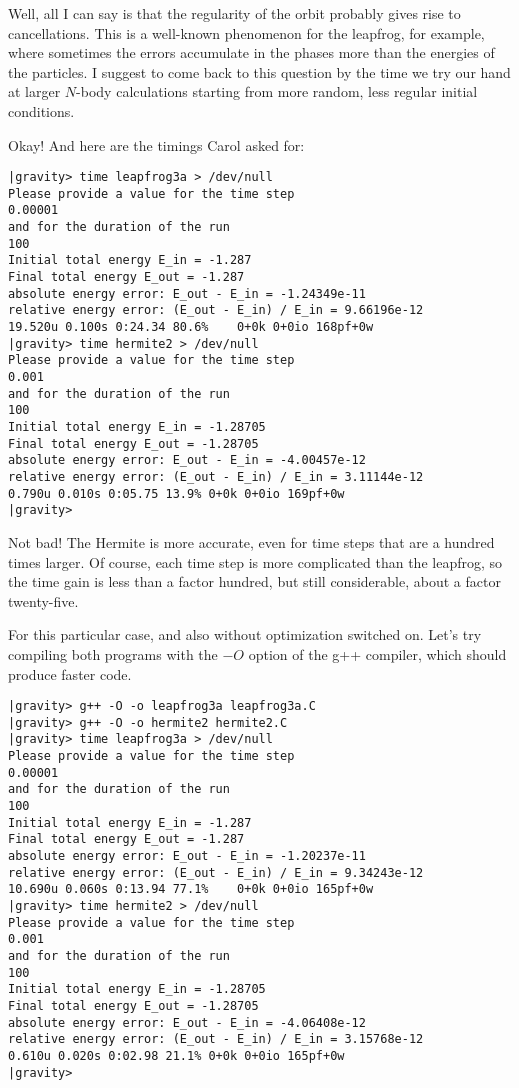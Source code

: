 \abc

\alice
Well, all I can say is that the regularity of the orbit probably gives
rise to cancellations.  This is a well-known phenomenon for the
leapfrog, for example, where sometimes the errors accumulate in the
phases more than the energies of the particles.  I suggest to come
back to this question by the time we try our hand at larger $N$-body
calculations starting from more random, less regular initial conditions.

\bob
Okay!  And here are the timings Carol asked for:

\cba

\begin{small}
\begin{verbatim}
|gravity> time leapfrog3a > /dev/null
Please provide a value for the time step
0.00001
and for the duration of the run
100
Initial total energy E_in = -1.287
Final total energy E_out = -1.287
absolute energy error: E_out - E_in = -1.24349e-11
relative energy error: (E_out - E_in) / E_in = 9.66196e-12
19.520u 0.100s 0:24.34 80.6%	0+0k 0+0io 168pf+0w
|gravity> time hermite2 > /dev/null
Please provide a value for the time step
0.001
and for the duration of the run
100
Initial total energy E_in = -1.28705
Final total energy E_out = -1.28705
absolute energy error: E_out - E_in = -4.00457e-12
relative energy error: (E_out - E_in) / E_in = 3.11144e-12
0.790u 0.010s 0:05.75 13.9%	0+0k 0+0io 169pf+0w
|gravity> 
\end{verbatim}
\end{small}

\abc

\carol
Not bad!  The Hermite is more accurate, even for time steps that are a
hundred times larger.  Of course, each time step is more complicated
than the leapfrog, so the time gain is less than a factor hundred, but
still considerable, about a factor twenty-five.

\alice
For this particular case, and also without optimization switched on.
Let's try compiling both programs with the $-O$ option of the g++
compiler, which should produce faster code.

\cba

\begin{small}
\begin{verbatim}
|gravity> g++ -O -o leapfrog3a leapfrog3a.C
|gravity> g++ -O -o hermite2 hermite2.C
|gravity> time leapfrog3a > /dev/null
Please provide a value for the time step
0.00001
and for the duration of the run
100
Initial total energy E_in = -1.287
Final total energy E_out = -1.287
absolute energy error: E_out - E_in = -1.20237e-11
relative energy error: (E_out - E_in) / E_in = 9.34243e-12
10.690u 0.060s 0:13.94 77.1%	0+0k 0+0io 165pf+0w
|gravity> time hermite2 > /dev/null
Please provide a value for the time step
0.001
and for the duration of the run
100
Initial total energy E_in = -1.28705
Final total energy E_out = -1.28705
absolute energy error: E_out - E_in = -4.06408e-12
relative energy error: (E_out - E_in) / E_in = 3.15768e-12
0.610u 0.020s 0:02.98 21.1%	0+0k 0+0io 165pf+0w
|gravity> 
\end{verbatim}
\end{small}

